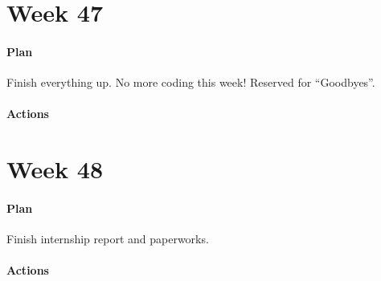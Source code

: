 \section{Week 47}

\paragraph{Plan} Finish everything up. No more coding this week! Reserved for
``Goodbyes''.

\paragraph{Actions} 

\section{Week 48}

\paragraph{Plan} Finish internship report and paperworks.

\paragraph{Actions} 

